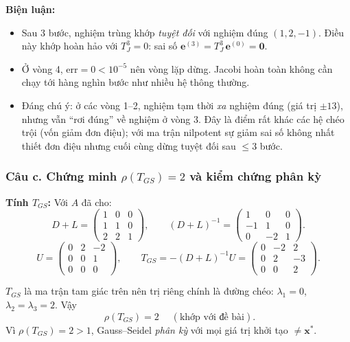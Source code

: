 \documentclass[12pt,a4paper]{article}
\begin{document}
\textbf{Biện luận:}
\begin{itemize}
    \item Sau 3 bước, nghiệm trùng khớp \emph{tuyệt đối} với nghiệm đúng $(1, 2, -1)$. Điều này khớp hoàn hảo với $T_J^3 = 0$: sai số $\mathbf{e}^{(3)} = T_J^3\,\mathbf{e}^{(0)} = \mathbf{0}$.
    \item Ở vòng 4, $\mathrm{err} = 0 < 10^{-5}$ nên vòng lặp dừng. Jacobi hoàn toàn không cần chạy tới hàng nghìn bước như nhiều hệ thông thường.
    \item Đáng chú ý: ở các vòng 1--2, nghiệm tạm thời \emph{xa} nghiệm đúng (giá trị $\pm 13$), nhưng vẫn ``rơi đúng'' về nghiệm ở vòng 3. Đây là điểm rất khác các hệ chéo trội (vốn giảm đơn điệu); với ma trận nilpotent sự giảm sai số không nhất thiết đơn điệu nhưng cuối cùng dừng tuyệt đối sau $\le 3$ bước.
\end{itemize}

\subsubsection{Câu c. Chứng minh $\rho(T_{GS}) = 2$ và kiểm chứng phân kỳ}

\textbf{Tính $T_{GS}$:} Với $A$ đã cho:
\[
    D + L = \begin{pmatrix} 1 & 0 & 0 \\ 1 & 1 & 0 \\ 2 & 2 & 1 \end{pmatrix}, \qquad
    (D+L)^{-1} = \begin{pmatrix} 1 & 0 & 0 \\ -1 & 1 & 0 \\ 0 & -2 & 1 \end{pmatrix}.
\]
\[
    U = \begin{pmatrix} 0 & 2 & -2 \\ 0 & 0 & 1 \\ 0 & 0 & 0 \end{pmatrix}, \qquad
    T_{GS} = -(D+L)^{-1}U = \begin{pmatrix} 0 & -2 & 2 \\ 0 & 2 & -3 \\ 0 & 0 & 2 \end{pmatrix}.
\]

$T_{GS}$ là ma trận tam giác trên nên trị riêng chính là đường chéo: $\lambda_1 = 0$, $\lambda_2 = \lambda_3 = 2$. Vậy
\begin{equation}
    \boxed{\;\rho(T_{GS}) = 2\;} \quad (\text{khớp với đề bài}).
\end{equation}
Vì $\rho(T_{GS}) = 2 > 1$, Gauss--Seidel \emph{phân kỳ} với mọi giá trị khởi tạo $\ne \mathbf{x}^\ast$.
\end{document}
